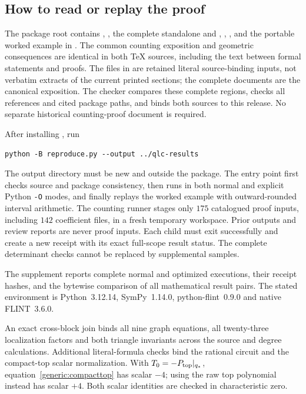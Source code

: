\documentclass[11pt,a4paper]{article}
\theoremstyle{remark}\newtheorem{remark}[theorem]{Remark}
\begin{document}
\subsection{How to read or replay the proof}
The package root contains , ,
the complete standalone  and ,
, ,  and the portable
worked example in . The common counting
exposition and geometric consequences are identical in both TeX sources,
including the text between formal statements and proofs. The files in
 are retained literal source-binding inputs, not verbatim
extracts of the current printed sections; the complete documents are the
canonical exposition. The checker
 compares these complete regions, checks all
references and cited package paths, and binds both sources to this release.
No separate historical counting-proof document is required.

After installing , run
\begin{verbatim}
python -B reproduce.py --output ../qlc-results
\end{verbatim}
The output directory must be new and outside the package. The entry point
first checks source and package consistency, then runs 
in both normal and explicit Python \texttt{-O} modes, and finally replays
the worked example with outward-rounded interval arithmetic. The counting
runner stages
only $175$ catalogued proof inputs, including $142$ coefficient files,
in a fresh temporary workspace. Prior outputs and review reports are
never proof inputs. Each child must exit successfully and create a new
receipt with its exact full-scope result status. The complete determinant
checks cannot be replaced by supplemental samples.

The supplement reports complete normal and optimized executions, their
receipt hashes, and the bytewise comparison of all mathematical result
pairs. The stated environment is Python~3.12.14, SymPy~1.14.0,
python-flint~0.9.0 and native FLINT~3.6.0.

An exact cross-block join binds all nine graph equations, all twenty-three
localization factors and both triangle invariants across the source and
degree calculations. Additional literal-formula checks bind the rational
circuit and the compact-top scalar normalization. With
$T_0=-P_{\rm top}|_{q_*}$, equation~\eqref{generic:compacttop} has scalar $-4$;
using the raw top polynomial instead has scalar $+4$. Both scalar
identities are checked in characteristic zero.
\end{document}
